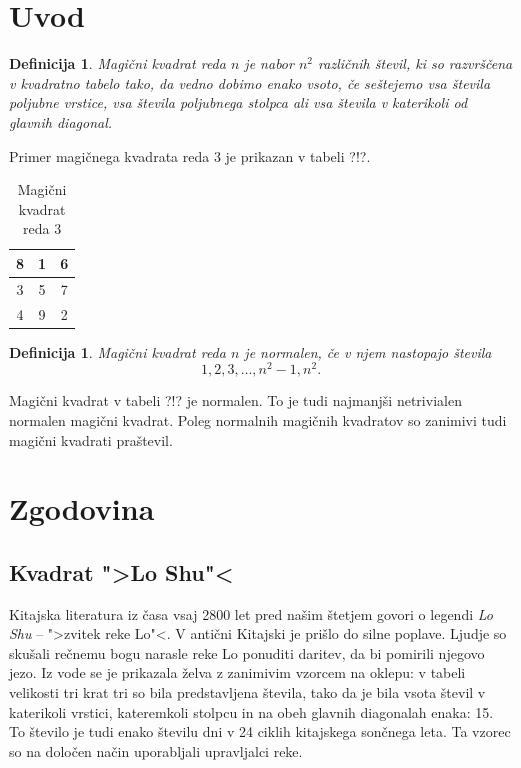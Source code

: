 \documentclass[a4paper,12pt]{article}
\newenvironment{magic}[3]{
   \begin{table}
      \centering
      \caption{#2}
      \label{#3}
      \Large
      \begin{tabular}{|*{#1}{c|}}\hline
}{
\end{tabular}
\end{table}
}
\newtheorem{definicija}[izrek]{Definicija}
\begin{document}
\newpage

\section{Uvod}

\begin{definicija}
   \emph{Magični kvadrat} reda $n$ je nabor $n^2$ različnih števil,
   ki so razvrščena v kvadratno tabelo tako, da vedno dobimo enako vsoto,
   če seštejemo vsa števila poljubne vrstice, vsa števila poljubnega
   stolpca ali vsa števila v katerikoli od glavnih diagonal.
\end{definicija}

Primer magičnega kvadrata reda 3 je prikazan v tabeli ?!?.

 \begin{magic}{3}{Magični kvadrat reda 3}{table:mag3}
   8 & 1 & 6 \\\hline
   3 & 5 & 7 \\\hline
   4 & 9 & 2 \\\hline
 \end{magic}

\begin{definicija}
   Magični kvadrat reda $n$ je \emph{normalen}, če v njem nastopajo števila
   \begin{equation}
      \label{eq:numbers}
      1, 2, 3, \ldots, n^2-1, n^2.
   \end{equation}
\end{definicija}

Magični kvadrat v tabeli ?!? je normalen.
To je tudi najmanjši netrivialen normalen magični kvadrat.
Poleg normalnih magičnih kvadratov so zanimivi tudi magični kvadrati praštevil.


\section{Zgodovina}

\subsection{Kvadrat ">Lo Shu"<}

Kitajska literatura iz časa vsaj 2800 let pred našim štetjem govori o legendi
\emph{Lo Shu} -- ">zvitek reke Lo"<. V antični Kitajski je prišlo do
silne poplave. Ljudje so skušali rečnemu bogu narasle reke Lo ponuditi daritev,
da bi pomirili njegovo jezo. Iz vode se je prikazala želva z zanimivim vzorcem
na oklepu: v tabeli velikosti tri krat tri so bila predstavljena števila, tako
da je bila vsota števil v katerikoli vrstici, kateremkoli stolpcu in na obeh
glavnih diagonalah enaka: 15. To število je tudi enako številu dni v 24 ciklih
kitajskega sončnega leta. Ta vzorec so na določen način uporabljali upravljalci
reke.
\end{document}
